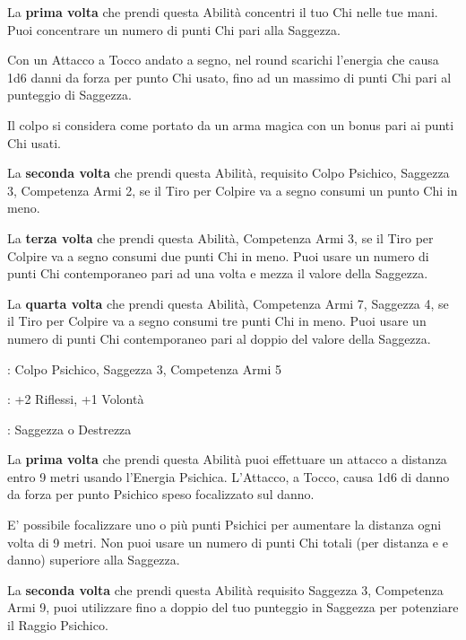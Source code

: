 \begin{multicols}{2}
La \textbf{prima volta} che prendi questa Abilità concentri il tuo Chi nelle tue mani. Puoi concentrare un numero di punti Chi pari alla Saggezza.

Con un Attacco a Tocco andato a segno, nel round scarichi l'energia che causa 1d6 danni da forza per punto Chi usato, fino ad un massimo di punti Chi pari al punteggio di Saggezza.

Il colpo si considera come portato da un arma magica con un bonus pari ai punti Chi usati.

La \textbf{seconda volta} che prendi questa Abilità, requisito Colpo Psichico, Saggezza 3, Competenza Armi 2, se il Tiro per Colpire va a segno consumi un punto Chi in meno.

La \textbf{terza volta} che prendi questa Abilità, Competenza Armi 3, se il Tiro per Colpire va a segno consumi due punti Chi in meno. Puoi usare un numero di punti Chi contemporaneo pari ad una volta e mezza il valore della Saggezza.

La \textbf{quarta volta} che prendi questa Abilità, Competenza Armi 7, Saggezza 4, se il Tiro per Colpire va a segno consumi tre punti Chi in meno. Puoi usare un numero di punti Chi contemporaneo pari al doppio del valore della Saggezza.

\begin{description}[noitemsep, topsep=0pt, parsep=0pt, partopsep=0pt, leftmargin=0cm, labelwidth=2.5cm]
    \item[\textbf{Requisito}]: Colpo Psichico, Saggezza 3, Competenza Armi 5
    \item[\textbf{Tiri Salvezza}]: +2 Riflessi, +1 Volontà
    \item[\textbf{Caratteristica}]: Saggezza o Destrezza
\end{description}

La \textbf{prima volta} che prendi questa Abilità puoi effettuare un attacco a distanza entro 9 metri usando l'Energia Psichica. L'Attacco, a Tocco, causa 1d6 di danno da forza per punto Psichico speso focalizzato sul danno.

E' possibile focalizzare uno o più punti Psichici per aumentare la distanza ogni volta di 9 metri. Non puoi usare un numero di punti Chi totali (per distanza e e danno) superiore alla Saggezza.

La \textbf{seconda volta} che prendi questa Abilità requisito Saggezza 3, Competenza Armi 9, puoi utilizzare fino a doppio del tuo punteggio in Saggezza per potenziare il Raggio Psichico.


\end{multicols}
